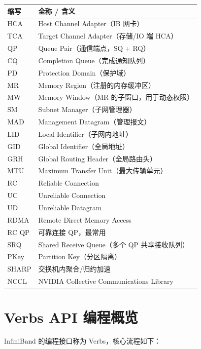 \begin{longtable}{ll}
\toprule
\textbf{缩写} & \textbf{全称 / 含义} \\
\midrule
\endhead
\bottomrule
\endfoot
HCA     & Host Channel Adapter（IB 网卡） \\
TCA     & Target Channel Adapter（存储/IO 端 HCA） \\
QP      & Queue Pair（通信端点，SQ + RQ） \\
CQ      & Completion Queue（完成通知队列） \\
PD      & Protection Domain（保护域） \\
MR      & Memory Region（注册的内存缓冲区） \\
MW      & Memory Window（MR 的子窗口，用于动态权限） \\
SM      & Subnet Manager（子网管理器） \\
MAD     & Management Datagram（管理报文） \\
LID     & Local Identifier（子网内地址） \\
GID     & Global Identifier（全局地址） \\
GRH     & Global Routing Header（全局路由头） \\
MTU     & Maximum Transfer Unit（最大传输单元） \\
RC      & Reliable Connection \\
UC      & Unreliable Connection \\
UD      & Unreliable Datagram \\
RDMA    & Remote Direct Memory Access \\
RC QP   & 可靠连接 QP，最常用 \\
SRQ     & Shared Receive Queue（多个 QP 共享接收队列） \\
PKey    & Partition Key（分区隔离） \\
SHARP   & 交换机内聚合/归约加速 \\
NCCL    & NVIDIA Collective Communications Library \\
\end{longtable}

\section{Verbs API 编程概览}

InfiniBand 的编程接口称为 Verbs，核心流程如下：

